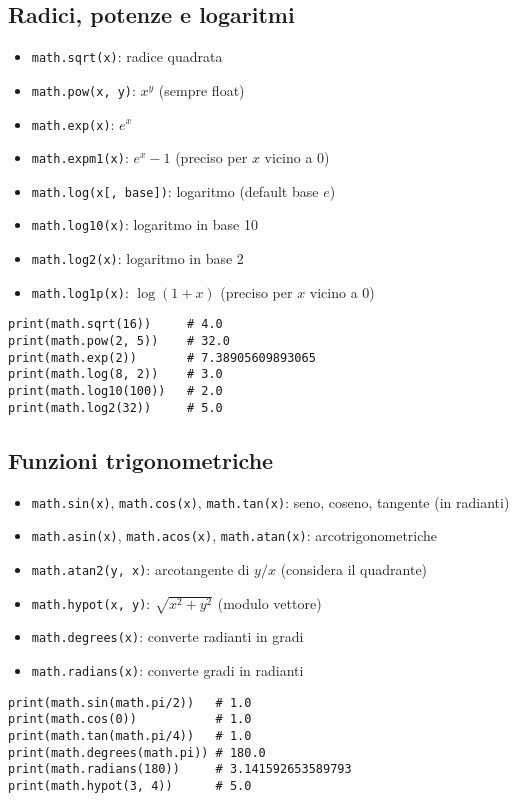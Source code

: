 \documentclass[a4paper,12pt]{article}
\begin{document}
\subsection*{Radici, potenze e logaritmi}
\begin{itemize}
    \item \texttt{math.sqrt(x)}: radice quadrata
    \item \texttt{math.pow(x, y)}: $x^y$ (sempre float)
    \item \texttt{math.exp(x)}: $e^x$
    \item \texttt{math.expm1(x)}: $e^x - 1$ (preciso per $x$ vicino a 0)
    \item \texttt{math.log(x[, base])}: logaritmo (default base $e$)
    \item \texttt{math.log10(x)}: logaritmo in base 10
    \item \texttt{math.log2(x)}: logaritmo in base 2
    \item \texttt{math.log1p(x)}: $\log(1+x)$ (preciso per $x$ vicino a 0)
\end{itemize}
\begin{lstlisting}
print(math.sqrt(16))     # 4.0
print(math.pow(2, 5))    # 32.0
print(math.exp(2))       # 7.38905609893065
print(math.log(8, 2))    # 3.0
print(math.log10(100))   # 2.0
print(math.log2(32))     # 5.0
\end{lstlisting}

\subsection*{Funzioni trigonometriche}
\begin{itemize}
    \item \texttt{math.sin(x)}, \texttt{math.cos(x)}, \texttt{math.tan(x)}: seno, coseno, tangente (in radianti)
    \item \texttt{math.asin(x)}, \texttt{math.acos(x)}, \texttt{math.atan(x)}: arcotrigonometriche
    \item \texttt{math.atan2(y, x)}: arcotangente di $y/x$ (considera il quadrante)
    \item \texttt{math.hypot(x, y)}: $\sqrt{x^2 + y^2}$ (modulo vettore)
    \item \texttt{math.degrees(x)}: converte radianti in gradi
    \item \texttt{math.radians(x)}: converte gradi in radianti
\end{itemize}
\begin{lstlisting}
print(math.sin(math.pi/2))   # 1.0
print(math.cos(0))           # 1.0
print(math.tan(math.pi/4))   # 1.0
print(math.degrees(math.pi)) # 180.0
print(math.radians(180))     # 3.141592653589793
print(math.hypot(3, 4))      # 5.0
\end{lstlisting}
\end{document}

